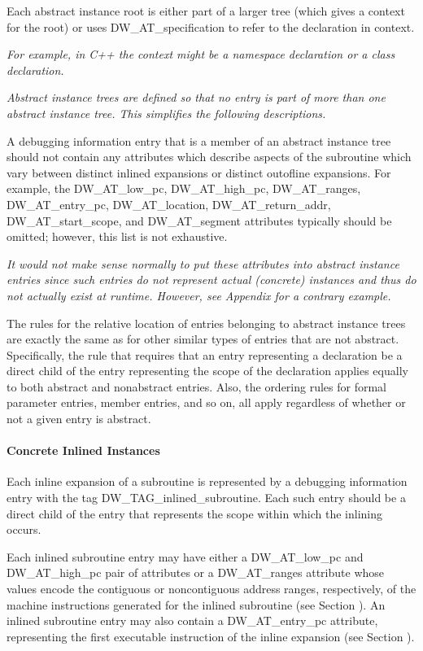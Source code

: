 Each abstract instance root is either part of a larger
tree (which gives a context for the root) or uses
DW\_AT\_specification to refer to the declaration in context.

\textit{For example, in C++ the context might be a namespace
declaration or a class declaration.}

\textit{Abstract instance trees are defined so that no entry is part
of more than one abstract instance tree. This simplifies the
following descriptions.}

A debugging information entry that is a member of an abstract
instance tree should not contain any attributes which describe
aspects of the subroutine which vary between distinct inlined
expansions or distinct out\dash of\dash line expansions. For example,
the DW\-\_AT\-\_low\-\_pc,
DW\-\_AT\-\_high\-\_pc, DW\-\_AT\-\_ranges, 
DW\-\_AT\-\_entry\-\_pc, DW\-\_AT\-\_location,
DW\-\_AT\-\_return\-\_addr, DW\-\_AT\-\_start\-\_scope, and 
DW\-\_AT\-\_segment
attributes typically should be omitted; however, this list
is not exhaustive.

\textit{It would not make sense normally to put these attributes into
abstract instance entries since such entries do not represent
actual (concrete) instances and thus do not actually exist at
run\dash time.  However, 
see Appendix  
for a contrary example.}

The rules for the relative location of entries belonging to
abstract instance trees are exactly the same as for other
similar types of entries that are not abstract. Specifically,
the rule that requires that an entry representing a declaration
be a direct child of the entry representing the scope of the
declaration applies equally to both abstract and non\dash abstract
entries. Also, the ordering rules for formal parameter entries,
member entries, and so on, all apply regardless of whether
or not a given entry is abstract.

\paragraph{Concrete Inlined Instances}
\label{chap:concreteinlinedinstances}

Each inline expansion of a subroutine is represented
by a debugging information entry with the tag
DW\_TAG\_inlined\_subroutine. Each such entry should be a direct
child of the entry that represents the scope within which
the inlining occurs.

Each inlined subroutine entry may have either a DW\_AT\_low\_pc
and DW\_AT\_high\_pc pair of attributes or a DW\_AT\_ranges
attribute whose values encode the contiguous or non\dash contiguous
address ranges, respectively, of the machine instructions
generated for the inlined subroutine (see 
Section ). An
inlined subroutine entry may also contain a DW\_AT\_entry\_pc
attribute, representing the first executable instruction of
the inline expansion (see 
Section ).

